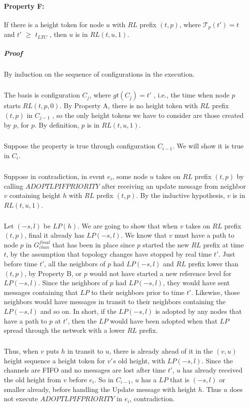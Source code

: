 \paragraph{Property F:} If there is a height token for node $u$ with $RL$ prefix $(t, p)$, where $\mathcal{T}_p(t') = t$ and $t'$ $\geq$ $t_{LTC}$ , then $u$ is in $RL (t, u, 1)$.
\subparagraph{Proof} By induction on the sequence of configurations in the execution.
\subparagraph{}The basis is configuration $C_j$, where $gt(C_j ) = t '$ , i.e., the time when node $p$ starts $RL (t, p, 0)$. By Property A, there is no height token with $RL$ prefix $(t, p)$ in $C_{j-1}$ , so the only height tokens we have to consider are those created by $p$, for $p$. By definition, $p$ is in $RL (t, u, 1)$.
\subparagraph{}Suppose the property is true through configuration $C_{i-1}$. We will show it is true in $C_i$.
\subparagraph{}Suppose in contradiction, in event $e_i$, some node $u$ takes on $RL$ prefix $(t, p)$ by calling $ADOPTLPIFPRIORITY$ after receiving an update message from neighbor $v$ containing height $h$ with $RL$ prefix $(t, p)$. By the inductive hypothesis, $v$ is in $RL (t, u, 1)$.
\subparagraph{}Let $(-s, l)$ be $LP(h)$. We are going to show that when $v$ takes on $RL$ prefix $(t, p)$, final it already has $LP (-s, l)$. We know that $v$ must have a path to node $p$ in $G_{chan} ^{final}$ that has been in place since $p$ started the new $RL$ prefix at time $t$, by the assumption that topology changes have stopped by real time $t'$. Just before time $t'$, all the neighbors of $p$ had $LP (-s, l)$ and $RL$ prefix lower than $(t, p)$, by Property B, or $p$ would not have started a new reference level for $LP (-s, l)$. Since the neighbors of $p$ had $LP (-s, l)$, they would have sent messages containing that $LP$ to their neighbors prior to time $t'$. Likewise, those neighbors would have messages in transit to their neighbors containing the $LP (-s, l)$ and so on. In short, if the $LP (-s, l)$ is adopted by any nodes that have a path to $p$ at $t'$, then the $LP$ would have been adopted when that $LP$ spread through the network with a lower $RL$ prefix. 
\subparagraph{}Thus, when $v$ puts $h$ in transit to $u$, there is already ahead of it in the $(v, u)$ height sequence a height token for $v's$ old height, with $LP (-s, l)$. Since the channels are FIFO and no messages are lost after time $t'$, $u$ has already received the old height from $v$ before $e_i$. So in $C_{i-1}$, $u$ has a $LP$ that is $(-s, l)$ or smaller already, before handling the Update message with height $h$. Thus $u$ does not execute $ADOPTLPIFPRIORITY$ in $e_i$, contradiction.
